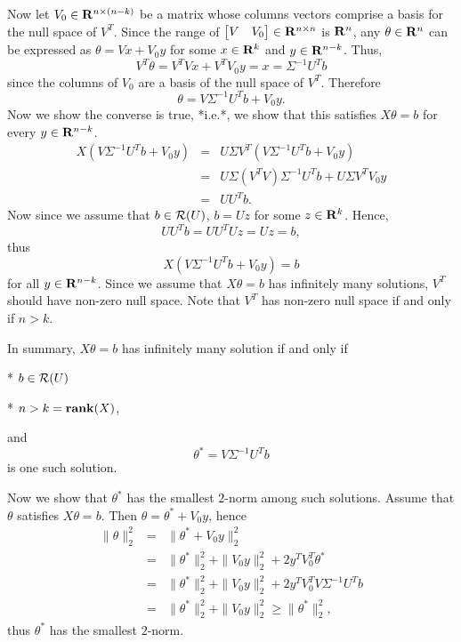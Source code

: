 \begin{enumerate}
\begin{solution}
\begin{enumerate}
Now let $V_0 \in\mathbf{R}^{n\times(n-k)}$ be a matrix whose columns vectors comprise a basis for the null space of $V^T$.
Since the range of $\begin{bmatrix} V & V_0 \end{bmatrix}\in\mathbf{R}^{n\times n}$ is $\mathbf{R}^n$,
any $\theta\in\mathbf{R}^n$ can be expressed as $\theta = Vx + V_0y$ for some $x\in\mathbf{R}^k$ and $y\in\mathbf{R}^{n-k}$.
Thus,
\begin{equation}
V^T\theta = V^TV x + V^TV_0 y = x = \Sigma^{-1} U^Tb
\end{equation}
since the columns of $V_0$ are a basis of the null space of $V^T$.
Therefore
\begin{equation}
\theta =  V\Sigma^{-1}U^Tb + V_0y.
\end{equation}
Now we show the converse is true,
*i.e.*,
we show that this satisfies $X\theta = b$ for every $y\in\mathbf{R}^{n-k}$.
\begin{eqnarray*}
X(V\Sigma^{-1}U^Tb + V_0y)
&=& U\Sigma V^T(V\Sigma^{-1}U^Tb + V_0y)
\\
&=& U\Sigma (V^TV)\Sigma^{-1}U^Tb + U\Sigma V^T V_0y
\\
&=& UU^Tb.
\end{eqnarray*}
Now since we assume that $b\in\mathcal{R}(U)$,
$b=Uz$ for some $z\in\mathbf{R}^k$.
Hence,
\begin{equation}
UU^Tb =  UU^TUz = Uz = b,
\end{equation}
thus
\begin{equation}
X(V\Sigma^{-1}U^Tb + V_0y) = b
\end{equation}
for all $y\in\mathbf{R}^{n-k}$.
Since we assume that $X\theta = b$ has infinitely many solutions,
$V^T$ should have non-zero null space.
Note that $V^T$ has non-zero null space if and only if $n>k$.

In summary, $X\theta = b$ has infinitely many solution if and only if

* $b\in\mathcal{R}(U)$

* $n > k = \mathbf{rank}(X)$,

and
\begin{equation}
\theta^\ast = V\Sigma^{-1}U^Tb
\end{equation}
is one such solution.

Now we show that $\theta^\ast$ has the smallest $2$-norm among such solutions.
Assume that $\theta$ satisfies $X\theta = b$.
Then $\theta =  \theta^\ast + V_0y$, hence
\begin{eqnarray*}
\|\theta\|_2^2
&=& \| \theta^\ast + V_0y \|_2^2
\\
&=& \| \theta^\ast\|_2^2 +\| V_0y \|_2^2 + 2 y^T V_0^T \theta^\ast
\\
&=& \| \theta^\ast\|_2^2 +\| V_0y \|_2^2 + 2 y^T V_0^T V\Sigma^{-1}U^Tb
\\
&=& \| \theta^\ast\|_2^2 +\| V_0y \|_2^2 \geq \|\theta^\ast\|_2^2,
\end{eqnarray*}
thus $\theta^\ast$ has the smallest $2$-norm.











\end{enumerate}
\end{solution}
\end{enumerate}
